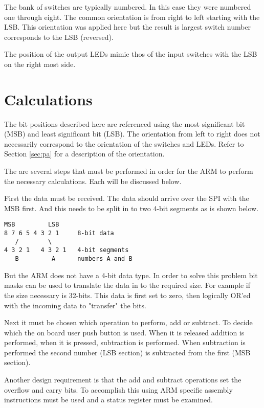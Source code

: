 \documentclass{article}
\begin{document}
The bank of switches are typically numbered.
In this case they were numbered one through eight.
The common orientation is from right to left starting
with the LSB.
This orientation was applied here but the result is
largest switch number corresponds to the LSB (reversed).

The position of the output LEDs mimic thos of the input
switches with the LSB on the right most side.

\section{Calculations}
\label{sec:calc}

The bit positions described here are referenced using the
most significant bit (MSB) and least significant bit (LSB).
The orientation from left to right does not necessarily
correspond to the orientation of the switches and LEDs.
Refer to Section \ref{sec:pa} for a description of the orientation.

The are several steps that must be performed in order for
the ARM to perform the necessary calculations.
Each will be discussed below.

First the data must be received.
The data should arrive over the SPI with the MSB first.
And this needs to be split in to two 4-bit segments
as is shown below.

\begin{verbatim}
MSB         LSB
8 7 6 5 4 3 2 1     8-bit data
   /        \
4 3 2 1   4 3 2 1   4-bit segments
   B         A      numbers A and B
\end{verbatim}

But the ARM does not have a 4-bit data type.
In order to solve this problem bit masks can be used to
translate the data in to the required size.
For example if the size necessary is 32-bits.
This data is first set to zero, then logically OR'ed with
the incoming data to "transfer" the bits.

Next it must be chosen which operation to perform, add or subtract.
To decide which the on board user push button\cite[Pg. 17]{UM1079}
is used.  When it is released addition is performed, when it
is pressed, subtraction is performed.
When subtraction is performed the second number (LSB section)
is subtracted from the first (MSB section).


Another design requirement is that the add and subtract operations
set the overflow and carry bits.
To accomplish this using ARM specific assembly instructions
must be used \cite[Pg. 54]{furber2000arm} and a status
register must be examined\cite[Pg. 40]{furber2000arm}.
\end{document}
